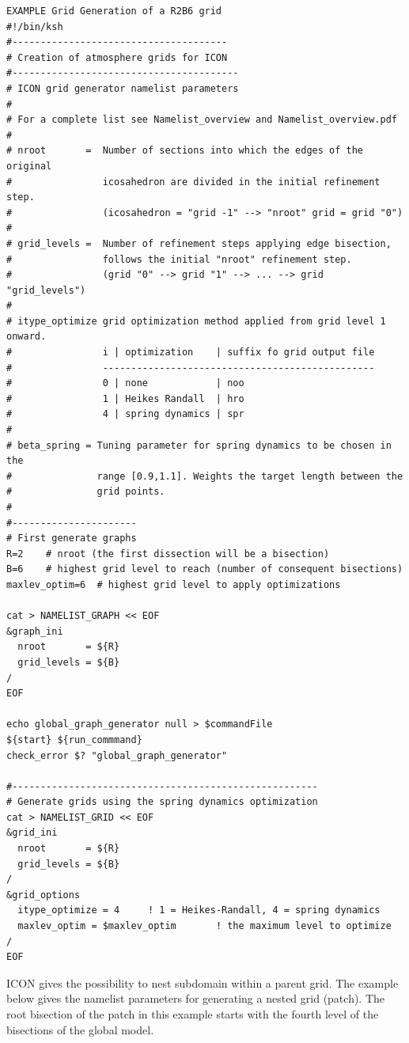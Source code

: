\begin{Verbatim}[frame=single]
EXAMPLE Grid Generation of a R2B6 grid
#!/bin/ksh
#--------------------------------------
# Creation of atmosphere grids for ICON
#----------------------------------------
# ICON grid generator namelist parameters
#
# For a complete list see Namelist_overview and Namelist_overview.pdf
#
# nroot       =  Number of sections into which the edges of the original 
#                icosahedron are divided in the initial refinement step.
#                (icosahedron = "grid -1" --> "nroot" grid = grid "0")
#                
# grid_levels =  Number of refinement steps applying edge bisection,
#                follows the initial "nroot" refinement step.
#                (grid "0" --> grid "1" --> ... --> grid "grid_levels")
#
# itype_optimize grid optimization method applied from grid level 1 onward.
#                i | optimization    | suffix fo grid output file
#                ------------------------------------------------
#                0 | none            | noo
#                1 | Heikes Randall  | hro
#                4 | spring dynamics | spr
#
# beta_spring = Tuning parameter for spring dynamics to be chosen in the 
#               range [0.9,1.1]. Weights the target length between the
#               grid points.
#
#----------------------
# First generate graphs
R=2    # nroot (the first dissection will be a bisection)
B=6    # highest grid level to reach (number of consequent bisections)
maxlev_optim=6  # highest grid level to apply optimizations

cat > NAMELIST_GRAPH << EOF
&graph_ini 
  nroot       = ${R}
  grid_levels = ${B}
/
EOF

echo global_graph_generator null > $commandFile
${start} ${run_commmand}
check_error $? "global_graph_generator"

#------------------------------------------------------
# Generate grids using the spring dynamics optimization
cat > NAMELIST_GRID << EOF
&grid_ini
  nroot       = ${R}
  grid_levels = ${B}
/
&grid_options
  itype_optimize = 4     ! 1 = Heikes-Randall, 4 = spring dynamics
  maxlev_optim = $maxlev_optim       ! the maximum level to optimize
/
EOF
\end{Verbatim}

ICON gives the possibility to nest subdomain within a parent grid. The example below gives the namelist parameters for generating a nested grid (patch). The root bisection of the patch in this example starts with the fourth level of the bisections of the global model.

